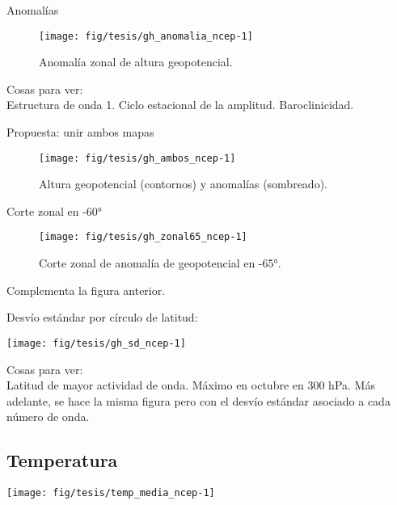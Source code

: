 \documentclass[spanish,a4paper]{book}
\begin{document}
Anomalías

\begin{figure}

{\centering \texttt{[image: fig/tesis/gh\_anomalia\_ncep-1]} 

}

\caption{Anomalía zonal de altura geopotencial.}\label{fig:gh_anomalia_ncep}
\end{figure}

Cosas para ver:\\
Estructura de onda 1. Ciclo estacional de la amplitud. Baroclinicidad.

Propuesta: unir ambos mapas

\begin{figure}

{\centering \texttt{[image: fig/tesis/gh\_ambos\_ncep-1]} 

}

\caption{Altura geopotencial (contornos) y anomalías (sombreado).}\label{fig:gh_ambos_ncep}
\end{figure}

Corte zonal en -60°

\begin{figure}

{\centering \texttt{[image: fig/tesis/gh\_zonal65\_ncep-1]} 

}

\caption{Corte zonal de anomalía de geopotencial en -65°.}\label{fig:gh_zonal65_ncep}
\end{figure}

Complementa la figura anterior.

Desvío estándar por círculo de latitud:

\begin{center}\texttt{[image: fig/tesis/gh\_sd\_ncep-1]} \end{center}

Cosas para ver:\\
Latitud de mayor actividad de onda. Máximo en octubre en 300 hPa. Más
adelante, se hace la misma figura pero con el desvío estándar asociado a
cada número de onda.

\subsection{Temperatura}\label{temperatura}

\begin{center}\texttt{[image: fig/tesis/temp\_media\_ncep-1]} \end{center}
\end{document}

